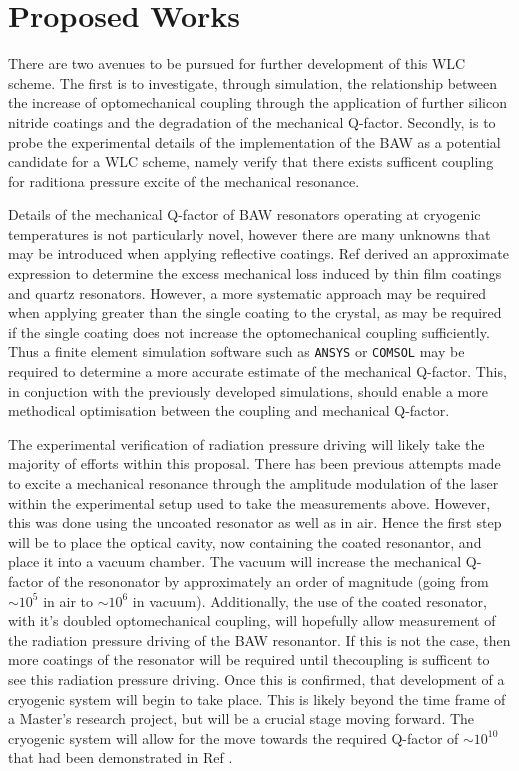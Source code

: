 \documentclass[aps,  
                a4paper, 
                amsmath, 
                amssymb, 
                preprint,
                tightenlines,  
                amsfonts,
                nofootinbib,
                onecolumn,
                titlepage,
                10pt
            ]{revtex4-2}
\begin{document}
    \section{Proposed Works}
    There are two avenues to be pursued for further development of this WLC scheme. The first is to investigate, through simulation, the relationship between the increase of optomechanical coupling through the application of further silicon nitride coatings and the degradation of the mechanical Q-factor. Secondly, is to probe the experimental details of the implementation of the BAW as a potential candidate for a WLC scheme, namely verify that there exists sufficent coupling for raditiona pressure excite of the mechanical resonance.
    \par
    Details of the mechanical Q-factor of BAW resonators operating at cryogenic temperatures is not particularly novel, however there are many unknowns that may be introduced when applying reflective coatings. Ref \cite{galliou2016} derived an approximate expression to determine the excess mechanical loss induced by thin film coatings and quartz resonators. However, a more systematic approach may be required when applying greater than the single coating to the crystal, as may be required if the single coating does not increase the optomechanical coupling sufficiently. Thus a finite element simulation software such as \texttt{ANSYS} or \texttt{COMSOL} may be required to determine a more accurate estimate of the mechanical Q-factor. This, in conjuction with the previously developed simulations, should enable a more methodical optimisation between the coupling and mechanical Q-factor. 
    \par
    The experimental verification of radiation pressure driving will likely take the majority of efforts within this proposal. There has been previous attempts made to excite a mechanical resonance through the amplitude modulation of the laser within the experimental setup used to take the measurements above. However, this was done using the uncoated resonator as well as in air. Hence the first step will be to place the optical cavity, now containing the coated resonantor, and place it into a vacuum chamber. The vacuum will increase the mechanical Q-factor of the resononator by approximately an order of magnitude (going from $\sim10^5$ in air to $\sim10^6$ in vacuum). Additionally, the use of the coated resonator, with it's doubled optomechanical coupling, will hopefully allow measurement of the radiation pressure driving of the BAW resonantor. If this is not the case, then more coatings of the resonator will be required until thecoupling is sufficent to see this radiation pressure driving. Once this is confirmed, that development of a cryogenic system will begin to take place. This is likely beyond the time frame of a Master's research project, but will be a crucial stage moving forward. The cryogenic system will allow for the move towards the required Q-factor of $\sim10^{10}$ that had been demonstrated in Ref \cite{galliou2013}.
\end{document}
